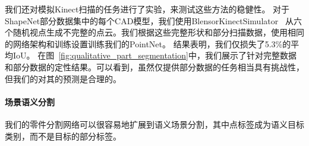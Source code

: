 我们还对模拟Kinect扫描的任务进行了实验，来测试这些方法的稳健性。 对于ShapeNet部分数据集中的每个CAD模型，我们使用BlensorKinectSimulator~\cite{Gschwandtner11b} 从六个随机视点生成不完整的点云。我们根据这些完整形状和部分扫描数据，使用相同的网络架构和训练设置训练我们的PointNet。 结果表明，我们仅损失了5.3\%的平均IoU。 在图~\ref{fig:qualitative_part_segmentation}中，我们展示了针对完整数据和部分数据的定性结果。可以看到，虽然仅提供部分数据的任务相当具有挑战性，但我们的对其的预测是合理的。

\paragraph{场景语义分割} 我们的零件分割网络可以很容易地扩展到语义场景分割，其中点标签成为语义目标类别，而不是目标的部分标签。

